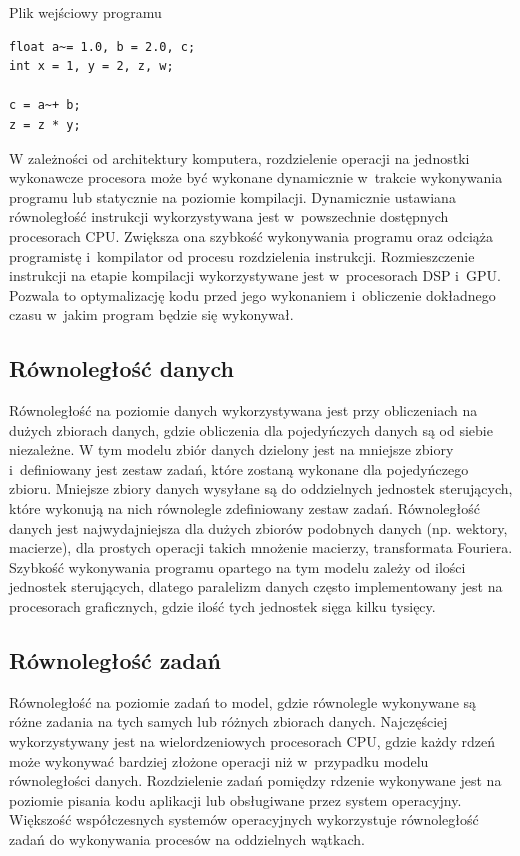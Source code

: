 \begin{program}
\caption{Plik wejściowy programu}
\begin{lstlisting}
float a~= 1.0, b = 2.0, c;
int x = 1, y = 2, z, w;

c = a~+ b;
z = z * y;
\end{lstlisting}
\end{program}

W zależności od architektury komputera, rozdzielenie operacji na jednostki wykonawcze procesora może być wykonane dynamicznie w~trakcie wykonywania programu lub statycznie na poziomie kompilacji. Dynamicznie ustawiana równoległość instrukcji wykorzystywana jest w~powszechnie dostępnych procesorach CPU. Zwiększa ona szybkość wykonywania programu oraz odciąża programistę i~kompilator od procesu rozdzielenia instrukcji. Rozmieszczenie instrukcji na etapie kompilacji wykorzystywane jest w~procesorach DSP i~GPU. Pozwala to optymalizację kodu przed jego wykonaniem i~obliczenie dokładnego czasu w~jakim program będzie się wykonywał.  

\subsection{Równoległość danych}\label{sec:datap}

Równoległość na poziomie danych wykorzystywana jest przy obliczeniach na dużych zbiorach danych, gdzie obliczenia dla pojedyńczych danych są od siebie niezależne. W tym modelu zbiór danych dzielony jest na mniejsze zbiory i~definiowany jest zestaw zadań, które zostaną wykonane dla pojedyńczego zbioru. Mniejsze zbiory danych wysyłane są do oddzielnych jednostek sterujących, które wykonują na nich równolegle zdefiniowany zestaw zadań. Równoległość danych jest najwydajniejsza dla dużych zbiorów podobnych danych (np. wektory, macierze), dla prostych operacji takich mnożenie macierzy, transformata Fouriera. Szybkość wykonywania programu opartego na tym modelu zależy od ilości jednostek sterujących, dlatego paralelizm danych często implementowany jest na procesorach graficznych, gdzie ilość tych jednostek sięga kilku tysięcy.

\subsection{Równoległość zadań}\label{sec:taskp}

Równoległość na poziomie zadań to model, gdzie równolegle wykonywane są różne zadania na tych samych lub różnych zbiorach danych. Najczęściej wykorzystywany jest na wielordzeniowych procesorach CPU, gdzie każdy rdzeń może wykonywać bardziej złożone operacji niż w~przypadku modelu równoległości danych. Rozdzielenie zadań pomiędzy rdzenie wykonywane jest na poziomie pisania kodu aplikacji lub obsługiwane przez system operacyjny. Większość współczesnych systemów operacyjnych wykorzystuje równoległość zadań do wykonywania procesów na oddzielnych wątkach.

